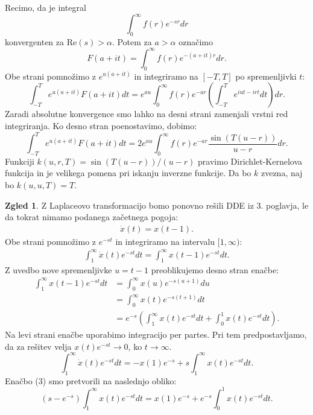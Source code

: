 \documentclass[12pt,a4paper]{amsart}
\theoremstyle{definition} %
\newtheorem{zgled}[definicija]{Zgled}
\theoremstyle{plain} %
\begin{document}
Recimo, da je integral 
\[\int_0^{\infty}f(r)e^{-sr}dr\]
konvergenten za $\text{Re}(s)>\alpha$. Potem za $a>\alpha$ označimo
\[F(a+it)=\int_0^{\infty}f(r)e^{-(a+it)r}dr.\]
Obe strani pomnožimo z $e^{u(a+it)}$ in integriramo na $[-T,T]$ po spremenljivki $t$:
\[\int_{-T}^{T}e^{u(a+it)}F(a+it)dt=e^{au}\int_0^{\infty}f(r)e^{-ar}\left(\int_{-T}^{T}e^{iut-irt}dt\right)dr.\]
Zaradi absolutne konvergence smo lahko na desni strani zamenjali vrstni red integriranja.
Ko desno stran poenostavimo, dobimo:
\[\int_{-T}^{T}e^{u(a+it)}F(a+it)dt=2e^{au}\int_0^{\infty}f(r)e^{-ar}\frac{\sin(T(u-r))}{u-r}dr.\]
Funkciji $k(u,r,T)=\sin(T(u-r))/(u-r)$ pravimo Dirichlet-Kernelova funkcija in je velikega pomena 
pri iskanju inverzne funkcije. Da bo $k$ zvezna, naj bo $k(u,u,T)=T$.
\begin{zgled}
    Z Laplaceovo transformacijo bomo ponovno rešili DDE iz 3. poglavja, le da tokrat 
    nimamo podanega začetnega pogoja:
    \begin{equation} \label{eq2}
        \begin{split}
     \dot{x}(t)=x(t-1).
        \end{split}
    \end{equation}
    Obe strani pomnožimo z $e^{-st}$ in integriramo na intervalu $[1,\infty)$:
    \begin{equation} \label{eq3}
        \begin{split}
     \int_{1}^{\infty}\dot{x}(t)e^{-st}dt = \int_{1}^{\infty}x(t-1)e^{-st}dt.
        \end{split}
    \end{equation}
    Z uvedbo nove spremenljivke $u=t-1$ preoblikujemo desno stran enačbe:
    \begin{equation*}
        \begin{split}
            \int_{1}^{\infty}x(t-1)e^{-st}dt &= \int_{0}^{\infty}x(u)e^{-s(u+1)}du \\
             &= \int_{0}^{\infty}x(t)e^{-s(t+1)}dt \\
             &= e^{-s}\left(\int_{1}^{\infty}x(t)e^{-st}dt + \int_{0}^{1}x(t)e^{-st}dt\right). 
        \end{split}      
    \end{equation*}
    Na levi strani enačbe uporabimo integracijo per partes. Pri tem predpostavljamo, da za 
    rešitev velja $x(t)e^{-st} \to 0$, ko $t \to\infty$.
    \[\int_{1}^{\infty}\dot{x}(t)e^{-st}dt=-x(1)e^{-s}+s\int_{1}^{\infty}x(t)e^{-st}dt.\]
    Enačbo (3) smo pretvorili na naslednjo obliko:
    \[(s-e^{-s})\int_{1}^{\infty}x(t)e^{-st}dt=x(1)e^{-s}+e^{-s}\int_0^1x(t)e^{-st}dt.\]

\end{zgled}
\end{document}
